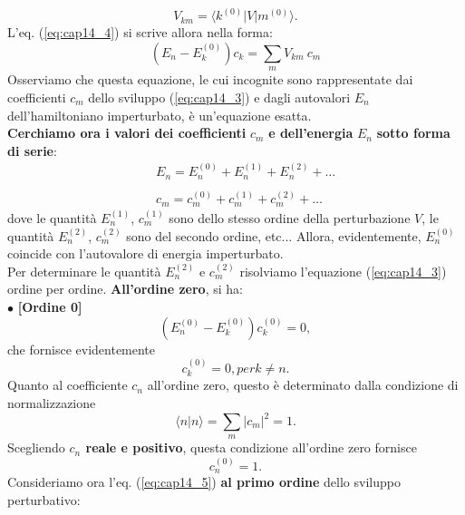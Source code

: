 \begin{equation}
V_{km} = \langle k^{(0)}\vert V\vert m^{(0)}\rangle.
\end{equation}
L'eq. (\ref{eq:cap14_4}) si scrive allora nella forma:
\begin{equation}
(E_n - E_k ^{(0)}) c_k = \sum _m V_{km}\ c_m
\label{eq:cap14_5}
\end{equation}
Osserviamo che questa equazione, le cui incognite sono rappresentate dai coefficienti $c_m$ dello sviluppo (\ref{eq:cap14_3}) e dagli autovalori $E_n$ dell'hamiltoniano imperturbato, è un'equazione esatta.\\
\textbf{Cerchiamo ora i valori dei coefficienti} $c_m$ \textbf{e dell'energia} $E_n$ \textbf{sotto forma di serie}:
\begin{eqnarray}
& &E_n = E_n ^{(0)}+E_n ^{(1)}+E_n ^{(2)}+\dots \nonumber \\
\\
& &c_m = c_m ^{(0)}+c_m ^{(1)}+c_m ^{(2)}+\dots \nonumber
\end{eqnarray}
dove le quantità $E_n ^{(1)}$, $c_m ^{(1)}$ sono dello stesso ordine della perturbazione $V$, le quantità $E_n ^{(2)}$, $c_m ^{(2)}$ sono del secondo ordine, etc... Allora, evidentemente, $E_n ^{(0)}$ coincide con l'autovalore di energia imperturbato.\\
Per determinare le quantità $E_n ^{(2)}$ e $c_m ^{(2)}$ risolviamo l'equazione (\ref{eq:cap14_3}) ordine per ordine. \textbf{All'ordine zero}, si ha:\\

$\bullet$ \textbf{[Ordine 0]}\\
\begin{equation}
\left(E_n ^{(0)}- E_k ^{(0)}\right)c_k ^{(0)}=0,
\end{equation}
che fornisce evidentemente
\begin{equation}
c_k ^{(0)}=0, per k\neq n.
\label{eq:cap14_6}
\end{equation}
Quanto al coefficiente $c_n$ all'ordine zero, questo è determinato dalla condizione di normalizzazione
\begin{equation}
\langle n \vert n \rangle = \sum _m \vert c_m \vert ^2 =1.
\end{equation}
Scegliendo \textbf{$c_n$ reale e positivo}, questa condizione all'ordine zero fornisce
\begin{equation}
c_n ^{(0)}=1.
\label{eq:cap14_7}
\end{equation}
Consideriamo ora l'eq. (\ref{eq:cap14_5}) \textbf{al primo ordine} dello sviluppo perturbativo:\\

